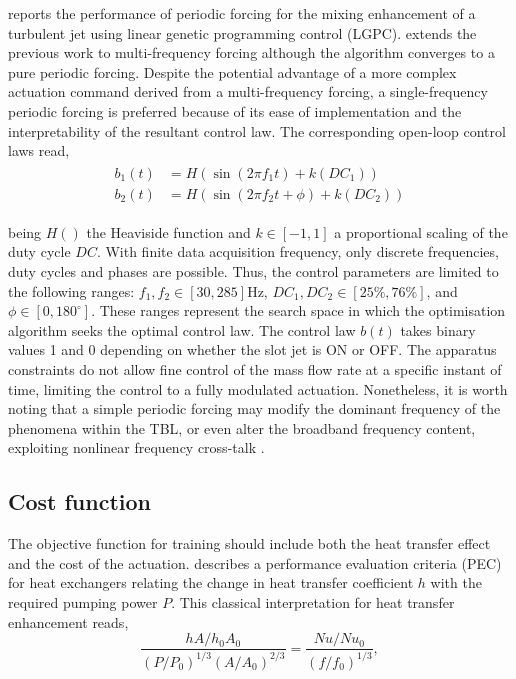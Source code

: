 \citet{Fan2017jetcontrol} reports the performance of periodic forcing for the mixing enhancement of a turbulent jet using linear genetic programming control (LGPC). \citet{Wu2018jet} extends the previous work to multi-frequency forcing although the algorithm converges to a pure periodic forcing. Despite the potential advantage of a more complex actuation command derived from a multi-frequency forcing, a single-frequency periodic forcing is preferred because of its ease of implementation and the interpretability of the resultant control law. The corresponding open-loop control laws read,
%
\begin{align}\label{eq:control}
    \begin{split}
        b_1(t) & = H\left( \sin(2\pi f_1 t) +k(DC_1)\right) \\
        b_2(t) & = H\left( \sin(2\pi f_2 t + \phi) +k(DC_2)\right)
    \end{split}
\end{align}

being $H()$ the Heaviside function and $k \in [-1, 1]$ a proportional scaling of the duty cycle $DC$. With finite data acquisition frequency, only discrete frequencies, duty cycles and phases are possible. Thus, the control parameters are limited to the following ranges: $f_1,f_2 \in [30,285] \mathrm{Hz}$, $DC_1,DC_2 \in [25\%,76\%]$, and $\phi \in [0, 180^\circ]$. These ranges represent the search space in which the optimisation algorithm seeks the optimal control law. The control law $b(t)$ takes binary values 1 and 0 depending on whether the slot jet is ON or OFF. The apparatus constraints do not allow fine control of the mass flow rate at a specific instant of time, limiting the control to a fully modulated actuation. Nonetheless, it is worth noting that a simple periodic forcing may modify the dominant frequency of the phenomena within the TBL, or even alter the broadband frequency content, exploiting nonlinear frequency cross-talk \citep{BruntonNoack2015review}.

\subsection{Cost function} \label{ss:cost_function}
%
The objective function for training should include both the heat transfer effect and the cost of the actuation. \citet{manglik2003heat} describes a performance evaluation criteria (PEC) for heat exchangers relating the change in heat transfer coefficient $h$ with the required pumping power $P$. This classical interpretation for heat transfer enhancement reads,
\begin{equation}
    \frac{hA/h_{0} A_{0}}{(P/P_{0})^{1/3}(A/A_{0})^{2/3}} = \frac{Nu/Nu_{0}}{(f/f_{0})^{1/3}},
\end{equation}
 
